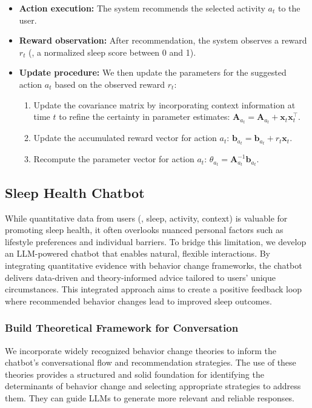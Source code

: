 \begin{itemize}
    \item \textbf{Action execution:} The system recommends the selected activity $a_t$ to the user.
    
    \item \textbf{Reward observation:} After recommendation, the system observes a reward $r_t$
    (\eg, a normalized sleep score between 0 and 1).
    
    \item \textbf{Update procedure:} We then update the parameters for the suggested action $a_t$ based on the observed reward $r_t$:
    \begin{enumerate}
        \item Update the covariance matrix by incorporating context information at time $t$ to refine the certainty in parameter estimates:
        $\mathbf{A}_{a_t} = \mathbf{A}_{a_t} + \mathbf{x}_t \mathbf{x}_t^\top$.
        
        \item Update the accumulated reward vector for action $a_t$:
        $\mathbf{b}_{a_t} = \mathbf{b}_{a_t} + r_t \mathbf{x}_t$.
        
        \item Recompute the parameter vector for action $a_t$:
        $\hat{\theta}_{a_t} = \mathbf{A}_{a_t}^{-1} \mathbf{b}_{a_t}$.
    \end{enumerate}    
\end{itemize}


\subsection{Sleep Health Chatbot}\label{sec.chatbot}
While quantitative data from users (\eg, sleep, activity, context) is valuable for promoting sleep health, it often overlooks nuanced personal factors such as lifestyle preferences and individual barriers. 
To bridge this limitation, we develop an LLM-powered chatbot that enables natural, flexible interactions. 
By integrating quantitative evidence with behavior change frameworks, the chatbot delivers data-driven and theory-informed advice tailored to users' unique circumstances.
This integrated approach aims to create a positive feedback loop where recommended behavior changes lead to improved sleep outcomes.

\subsubsection{Build Theoretical Framework for Conversation}\label{subsec.chatbot_framework}
We incorporate widely recognized behavior change theories
to inform the chatbot's conversational flow and recommendation strategies.
The use of these theories provides a structured and solid foundation for identifying the determinants of behavior change and selecting appropriate strategies to address them.
They can guide LLMs to generate more relevant and reliable responses.

